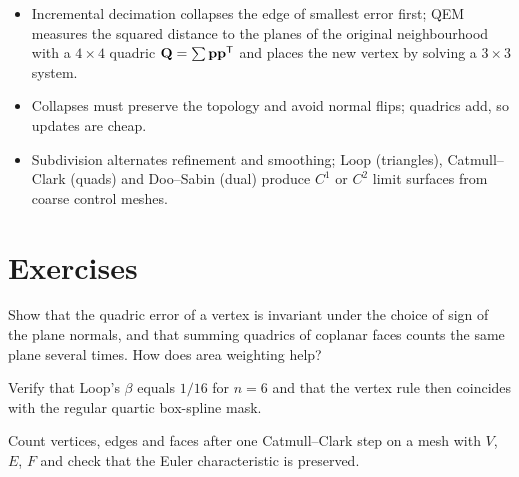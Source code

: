 \begin{keypoints}
\begin{itemize}[leftmargin=*]
  \item Incremental decimation collapses the edge of smallest error first; QEM measures the
  squared distance to the planes of the original neighbourhood with a $4\times4$ quadric
  $\mathbf{Q}=\sum\mathbf{p}\mathbf{p}^{\mathsf{T}}$ and places the new vertex by solving a $3\times3$ system.
  \item Collapses must preserve the topology and avoid normal flips; quadrics add, so updates are
  cheap.
  \item Subdivision alternates refinement and smoothing; Loop (triangles), Catmull--Clark (quads)
  and Doo--Sabin (dual) produce $C^1$ or $C^2$ limit surfaces from coarse control meshes.
\end{itemize}
\end{keypoints}

\section*{Exercises}
\begin{exercise}
Show that the quadric error of a vertex is invariant under the choice of sign of the plane
normals, and that summing quadrics of coplanar faces counts the same plane several times. How
does area weighting help?
\end{exercise}
\begin{exercise}
Verify that Loop's $\beta$ equals $1/16$ for $n=6$ and that the vertex rule then coincides with the
regular quartic box-spline mask.
\end{exercise}
\begin{exercise}
Count vertices, edges and faces after one Catmull--Clark step on a mesh with $V$, $E$, $F$ and check
that the Euler characteristic is preserved.
\end{exercise}
